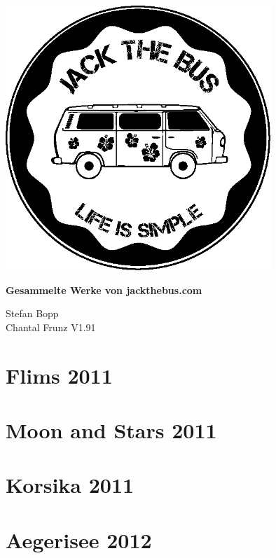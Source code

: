 \documentclass[11pt,nswissgerman]{article}
\begin{document}
\begin{titlepage}
\centering
\includegraphics[width=10cm]{../Bilder/Logo/Logo.png} \\
\vspace{2cm}
{\huge\bfseries Gesammelte Werke von jackthebus.com\par}
\vspace{2cm}
{\Large Stefan Bopp} \\
{\Large Chantal Frunz}
\vfill
{\large V1.91}
\thispagestyle{empty}

\end{titlepage}

\newpage
\lhead{\leftmark}

\cfoot{\thepage}

\tableofcontents
\newpage
\section{Flims 2011}

\newpage
\section{Moon and Stars 2011}

\newpage
\section{Korsika 2011}

\newpage
\section{Aegerisee 2012}

\newpage
\end{document}
